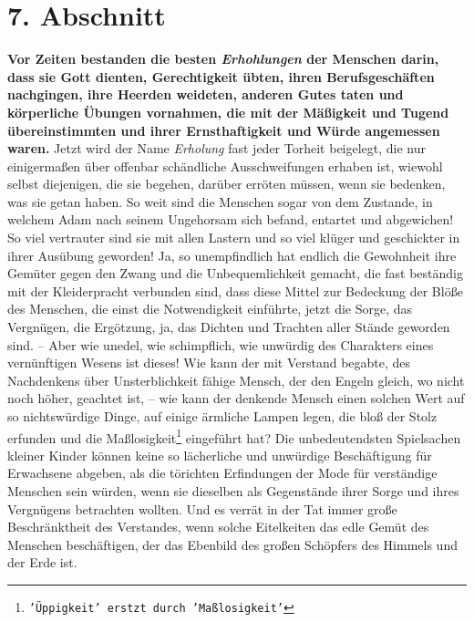 \section{7. Abschnitt} \label{kap14_ab7}

\label{ref:14_07_wahre_nachfolger_erholung}
 \textbf{Vor Zeiten bestanden die
besten \textit{Erhohlungen} der Menschen darin, dass sie Gott
dienten, Gerechtigkeit übten, ihren Berufsgeschäften nachgingen, ihre Heerden
weideten, anderen Gutes taten und körperliche Übungen vornahmen, die mit der
Mäßigkeit und Tugend übereinstimmten und ihrer Ernsthaftigkeit und Würde
angemessen waren.} Jetzt wird der Name \textit{Erholung} fast jeder Torheit
beigelegt, die nur einigermaßen über offenbar schändliche Ausschweifungen
erhaben ist, wiewohl selbst diejenigen, die sie begehen, darüber erröten
müssen, wenn sie bedenken, was sie getan haben. So weit sind die Menschen sogar
von dem Zustande, in welchem Adam nach seinem Ungehorsam
sich befand, entartet
und abgewichen! So viel vertrauter sind sie mit allen Lastern und so viel klüger
und geschickter in ihrer Ausübung geworden! Ja, so unempfindlich hat endlich die
Gewohnheit ihre Gemüter gegen den Zwang und die Unbequemlichkeit gemacht, die
fast beständig mit der Kleiderpracht verbunden sind, dass diese Mittel zur
Bedeckung der Blöße des Menschen, die einst die Notwendigkeit einführte, jetzt
die Sorge, das Vergnügen, die Ergötzung, ja, das Dichten und Trachten aller
Stände geworden sind. -- Aber wie unedel, wie schimpflich, wie unwürdig des
Charakters eines vernünftigen Wesens ist dieses! Wie kann der mit Verstand
begabte, des Nachdenkens über Unsterblichkeit fähige Mensch, der den
Engeln
gleich, wo nicht noch höher, geachtet ist, -- wie kann der denkende Mensch einen
solchen Wert auf so nichtswürdige Dinge, auf einige ärmliche Lampen legen, die
bloß der Stolz erfunden und die Maßlosigkeit\footnote{\texttt{'Üppigkeit' erstzt
durch 'Maßlosigkeit'}}
eingeführt hat? Die unbedeutendsten
Spielsachen kleiner Kinder können keine so lächerliche und
unwürdige
Beschäftigung für Erwachsene abgeben, als die törichten Erfindungen der Mode
für verständige Menschen sein würden, wenn sie dieselben als Gegenstände ihrer
Sorge und ihres Vergnügens betrachten wollten. Und es verrät in der Tat immer
große Beschränktheit des Verstandes, wenn solche Eitelkeiten das edle Gemüt des
Menschen beschäftigen, der das Ebenbild des großen Schöpfers des Himmels und der
Erde ist.

